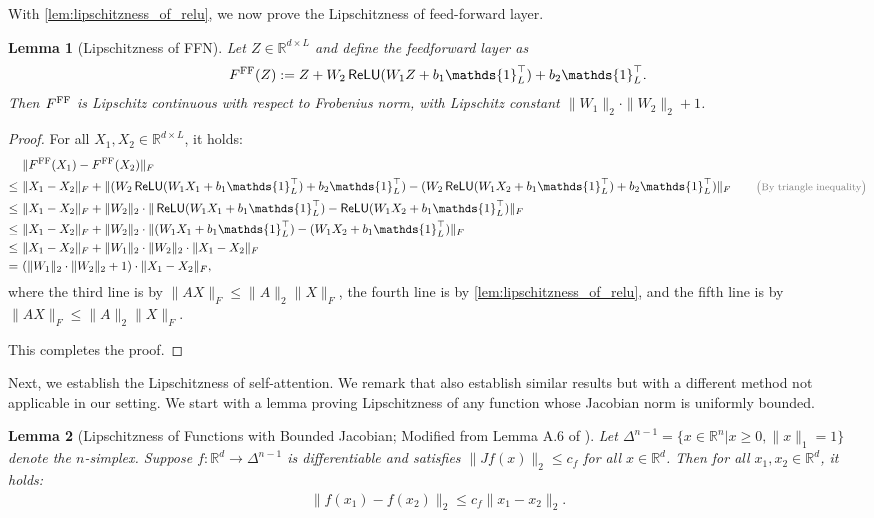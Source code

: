 \documentclass[12pt]{article}
\numberwithin{equation}{section}
\newcommand{\one}{\mathds{1}}
\newcommand{\ReLU}{\mathop{\mathsf{ReLU}}}
\def\R{\mathbb{R}}
\let\cite\citep
\theoremstyle{theoremstyle}
\newtheorem{lemma}{Lemma}[section]
\numberwithin{equation}{section}
\numberwithin{theorem}{section}
\numberwithin{proposition}{section}
\numberwithin{definition}{section}
\numberwithin{lemma}{section}
\numberwithin{assumption}{section}
\numberwithin{remark}{section}
\newcommand*{\annot}[1]{\tag*{\footnotesize{\textcolor{black!50}{\big(#1\big)}}}}
\begin{document}
With \cref{lem:lipschitzness_of_relu}, we now prove the Lipschitzness of feed-forward layer.

\begin{lemma}[Lipschitzness of FFN]\label{lem:lipschitzness_of_feedforward}
Let $Z\in \R^{d \times L}$ and define the feedforward layer as
\begin{align*}
    F^{\rm FF}(Z) := Z+W_2\ReLU(W_1Z+b_1\one_L^\top)+b_2\one_L^\top.
\end{align*}
Then $F^{\rm FF}$ is Lipschitz continuous with respect to Frobenius norm, with Lipschitz constant 
$\|W_1\|_2\cdot\|W_2\|_2+1$.
\end{lemma}

\begin{proof}
For all $X_1,X_2\in\R^{d\times L}$, it holds:
\begin{align*}
    & ~ \|F^{\rm FF}(X_1)-F^{\rm FF}(X_2)\|_F \\
    \leq & ~
    \|X_1-X_2\|_F+\|(W_2\ReLU(W_1X_1+b_1\one_L^\top)+b_2\one_L^\top)-(W_2\ReLU(W_1X_2+b_1\one_L^\top)+b_2\one_L^\top)\|_F \annot{By triangle inequality}\\
    \leq & ~ 
    \|X_1-X_2\|_F+\|W_2\|_2\cdot \|\ReLU(W_1X_1+b_1\one_L^\top)-\ReLU(W_1X_2+b_1\one_L^\top)\|_F \\
    \leq &  ~
    \|X_1-X_2\|_F+\|W_2\|_2\cdot\|(W_1X_1+b_1\one_L^\top)-(W_1X_2+b_1\one_L^\top)\|_F \\
    \leq & ~
     \|X_1-X_2\|_F+\|W_1\|_2\cdot\|W_2\|_2\cdot\|X_1-X_2\|_F  \\
     = & ~
     (\|W_1\|_2\cdot\|W_2\|_2+1)\cdot\|X_1-X_2\|_F,
\end{align*}
where the third line is by $\|AX\|_F\leq\|A\|_2\|X\|_F$, the fourth line is by \cref{lem:lipschitzness_of_relu}, and the fifth line is by $\|AX\|_F\leq\|A\|_2\|X\|_F$.

This completes the proof.
\end{proof}

Next, we establish the Lipschitzness of self-attention.
We remark that \citet{castin2024smoothattention} also establish similar results but with a different method not applicable in our setting.
We start with a lemma proving Lipschitzness of any function whose Jacobian norm is uniformly bounded.

\begin{lemma}[Lipschitzness of Functions with Bounded Jacobian; Modified from Lemma A.6 of \cite{edelman2022inductivebiasesvariablecreation}]\label{lem:bound_norm_with_jacobi}
Let $\Delta^{n-1}=\{x\in\R^n|x\geq0,\|x\|_1=1\}$ denote the $n$-simplex.
Suppose $f:\R^d\to\Delta^{n-1}$ is differentiable and satisfies $\|J f(x)\|_2\leq c_f$ for all $x\in\R^d$.
Then for all $x_1,x_2\in\R^d$, it holds:
\begin{align*}
    \|f(x_1)-f(x_2)\|_2\leq c_f\|x_1-x_2\|_2.
\end{align*}
\end{lemma}
\end{document}
